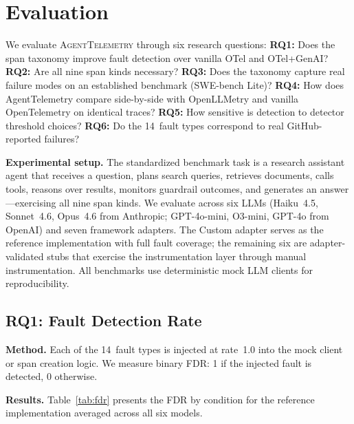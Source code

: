 \documentclass[sigconf,screen]{acmart}
\begin{document}
\section{Evaluation}
\label{sec:evaluation}

We evaluate \textsc{AgentTelemetry} through six research questions:
\textbf{RQ1:} Does the span taxonomy improve fault detection over
vanilla OTel and OTel+GenAI?
\textbf{RQ2:} Are all nine span kinds necessary?
\textbf{RQ3:} Does the taxonomy capture real failure modes on an
established benchmark (SWE-bench Lite)?
\textbf{RQ4:} How does AgentTelemetry compare side-by-side with
OpenLLMetry and vanilla OpenTelemetry on identical traces?
\textbf{RQ5:} How sensitive is detection to detector threshold
choices?
\textbf{RQ6:} Do the 14~fault types correspond to real GitHub-reported
failures?

\textbf{Experimental setup.}
The standardized benchmark task is a research assistant agent that
receives a question, plans search queries, retrieves documents, calls
tools, reasons over results, monitors guardrail outcomes, and generates
an answer---exercising all nine span kinds.  We evaluate across
six LLMs (Haiku~4.5, Sonnet~4.6, Opus~4.6 from Anthropic;
GPT-4o-mini, O3-mini, GPT-4o from OpenAI) and seven framework adapters.
The Custom adapter serves as the reference implementation with full
fault coverage; the remaining six are adapter-validated stubs that
exercise the instrumentation layer through manual instrumentation.
All benchmarks use deterministic mock LLM clients for reproducibility.

\subsection{RQ1: Fault Detection Rate}
\label{sec:fdr}

\textbf{Method.}
Each of the 14~fault types is injected at rate~1.0 into the mock client
or span creation logic.  We measure binary FDR: 1 if the injected fault
is detected, 0 otherwise.

\textbf{Results.}
Table~\ref{tab:fdr} presents the FDR by condition for the reference
implementation averaged across all six models.
\end{document}
